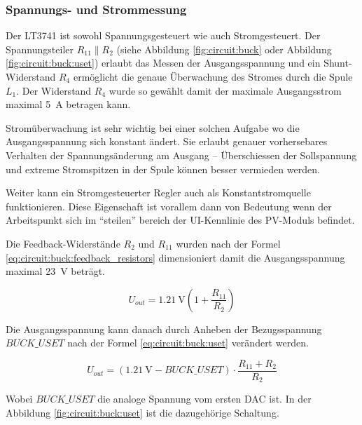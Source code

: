 \subsubsection{Spannungs- und Strommessung}

Der  LT3741  ist  sowohl   Spannungsgesteuert   wie   auch  Stromgesteuert.  Der
Spannungsteiler  $R_{11} \parallel R_2$ (siehe Abbildung  \ref{fig:circuit:buck}
oder    Abbildung    \ref{fig:circuit:buck:uset})   erlaubt   das   Messen   der
Ausgangsspannung  und  ein  Shunt-Widerstand  $R_4$   erm\"oglicht   die  genaue
\"Uberwachung des Stromes durch die Spule  $L_1$.  Der Widerstand $R_4$ wurde so
gew\"ahlt damit der  maximale  Ausgangsstrom  maximal  \SI{5}{\ampere}  betragen
kann.

Strom\"uberwachung   ist  sehr  wichtig  bei  einer  solchen  Aufgabe   wo   die
Ausgangsspannung  sich  konstant  \"andert.  Sie erlaubt  genauer  vorhersebares
Verhalten der Spannungs\"anderung am Ausgang -- \"Uberschiessen der Sollspannung
und  extreme  Stromspitzen  in  der  Spule  k\"onnen  besser  vermieden  werden.

Weiter   kann   ein   Stromgesteuerter   Regler  auch  als   Konstantstromquelle
funktionieren. Diese Eigenschaft  ist  vorallem  dann  von  Bedeutung  wenn  der
Arbeitspunkt  sich  im  ``steilen''  bereich  der   UI-Kennlinie  des  PV-Moduls
befindet.

Die  Feedback-Widerst\"ande   $R_2$   und   $R_{11}$   wurden  nach  der  Formel
\ref{eq:circuit:buck:feedback_resistors}       dimensioniert      damit      die
Ausgangsspannung maximal \SI{23}{\volt} betr\"agt.

\begin{equation}
    U_{out} = \SI{1.21}{\volt} \left( 1 + \frac{R_{11}}{R_2} \right)
    \label{eq:circuit:buck:feedback_resistors}
\end{equation}

Die Ausgangsspannung kann  danach  durch Anheben der Bezugsspannung $BUCK\_USET$
nach der  Formel \ref{eq:circuit:buck:uset} ver\"andert werden. 

\begin{equation}
    U_{out} = (\SI{1.21}{\volt} - BUCK\_USET) \cdot \frac{R_{11} + R_2}{R_2}
    \label{eq:circuit:buck:uset}
\end{equation}

Wobei $BUCK\_USET$ die analoge Spannung vom  ersten  DAC  ist.  In der Abbildung
\ref{fig:circuit:buck:uset} ist die dazugeh\"orige Schaltung.

